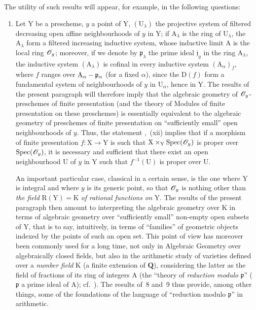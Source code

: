 \begin{env}[8.1.2]
\label{IV.8.1.2}
The utility of such results will appear, for example, in the following questions:
\begin{enumerate}[label=\emph{\alph*)}]
  \item
  Let $\mathrm{Y}$ be a prescheme, $y$ a point of $\mathrm{Y}$, $(\mathrm{U}_\lambda)$ the projective system of filtered decreasing open affine neighbourhoods of $y$ in $\mathrm{Y}$; if $\mathrm{A}_\lambda$ is the ring of $\mathrm{U}_\lambda$, the $\mathrm{A}_\lambda$ form a filtered increasing inductive system, whose inductive limit $\mathrm{A}$ is the local ring $\mathscr{O}_y$; moreover, if we denote by $\mathfrak{p}_\lambda$ the prime ideal $\mathfrak{j}_y$ in the ring $\mathrm{A}_\lambda$, the inductive system $(\mathrm{A}_\lambda)$ is cofinal in every inductive system $(\mathrm{A}_\alpha)_f$, where $f$ ranges over $\mathrm{A}_\alpha-\mathfrak{p}_\alpha$
(for a fixed $\alpha$), since the $\mathrm{D}(f)$ form a fundamental system of neighbourhoods of $y$ in $\mathrm{U}_\alpha$, hence in $\mathrm{Y}$.
The results of the present paragraph will therefore imply that the algebraic geometry of $\mathscr{O}_y$-preschemes of finite presentation (and the theory of Modules of finite presentation on these preschemes) is essentially equivalent to the algebraic geometry of preschemes of finite presentation on ``sufficiently small'' open neighbourhoods of $y$.
Thus, the statement ,~(xii) implies that if a morphism of finite presentation $f:\mathrm{X}\to\mathrm{Y}$ is such that $\mathrm{X}\times_\mathrm{Y}\operatorname{Spec}(\mathscr{O}_y)$ is proper over $\operatorname{Spec}(\mathscr{O}_y)$, it is necessary and sufficient that there exist an open neighbourhood $\mathrm{U}$ of $y$ in $\mathrm{Y}$ such that $f^{-1}(\mathrm{U})$ is proper over $\mathrm{U}$.

An important particular case, classical in a certain sense, is the one where $\mathrm{Y}$ is integral and where $y$ is its generic point, so that $\mathscr{O}_y$ is nothing other than \emph{the field} $\mathrm{R}(\mathrm{Y})=\mathrm{K}$ \emph{of rational functions on} $\mathrm{Y}$.
The results of the present paragraph then amount to interpreting the algebraic geometry over $\mathrm{K}$ in terms of algebraic geometry over ``sufficiently small'' non-empty open subsets of $\mathrm{Y}$, that is to say, intuitively, in terms of ``families'' of geometric objects indexed by the points of such an open set.
This point of view has moreover been commonly used for a long time, not only in Algebraic Geometry over algebraically closed fields, but also in the arithmetic study of varieties defined over a \emph{number field} $\mathrm{K}$ (a finite extension of $\mathbf{Q}$), considering the latter as the field of fractions of its ring of integers $\mathrm{A}$ (the ``theory of \emph{reduction modulo} $\mathfrak{p}$'' ($\mathfrak{p}$ a prime ideal of $\mathrm{A}$); cf.\ ).
The results of \textsection\textsection\,8 and~9 thus provide, among other things, some of the foundations of the language of ``reduction modulo $\mathfrak{p}$'' in arithmetic.


\end{enumerate}
\end{env}
